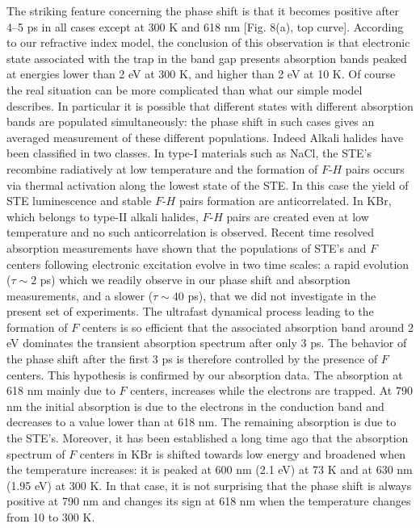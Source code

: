 \documentclass[aps,prb,reprint]{revtex4-2}
\begin{document}
The striking feature concerning the phase shift is that it becomes positive after 4--5 ps in all cases except at 300 K and 618 nm [Fig. 8(a), top curve]. According to our refractive index model, the conclusion of this observation is that electronic state associated with the trap in the band gap presents absorption bands peaked at energies lower than 2 eV at 300 K, and higher than 2 eV at 10 K. Of course the real situation can be more complicated than what our simple model describes. In particular it is possible that different states with different absorption bands are populated simultaneously: the phase shift in such cases gives an averaged measurement of these different populations. Indeed Alkali halides have been classified in two classes.\cite{30} In type-I materials such as NaCl, the STE's recombine radiatively at low temperature and the formation of $F$-$H$ pairs occurs via thermal activation along the lowest state of the STE. In this case the yield of STE luminescence and stable $F$-$H$ pairs formation are anticorrelated. In KBr, which belongs to type-II alkali halides, $F$-$H$ pairs are created even at low temperature and no such anticorrelation is observed. Recent time resolved absorption measurements have shown that the populations of STE's and $F$ centers following electronic excitation evolve in two time scales:\cite{2,7} a rapid evolution ($\tau \sim 2$ ps) which we readily observe in our phase shift and absorption measurements, and a slower ($\tau \sim 40$ ps), that we did not investigate in the present set of experiments. The ultrafast dynamical process leading to the formation of $F$ centers is so efficient that the associated absorption band around 2 eV dominates the transient absorption spectrum after only 3 ps.\cite{2,7} The behavior of the phase shift after the first 3 ps is therefore controlled by the presence of $F$ centers. This hypothesis is confirmed by our absorption data. The absorption at 618 nm mainly due to $F$ centers, increases while the electrons are trapped. At 790 nm the initial absorption is due to the electrons in the conduction band and decreases to a value lower than at 618 nm. The remaining absorption is due to the STE's. Moreover, it has been established a long time ago\cite{31} that the absorption spectrum of $F$ centers in KBr is shifted towards low energy and broadened when the temperature increases: it is peaked at 600 nm (2.1 eV) at 73 K and at 630 nm (1.95 eV) at 300 K. In that case, it is not surprising that the phase shift is always positive at 790 nm and changes its sign at 618 nm when the temperature changes from 10 to 300 K.
\end{document}
